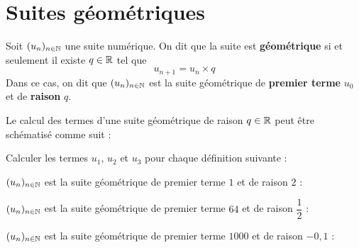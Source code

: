 \documentclass{poly}
\begin{document}
\section{Suites géométriques}
\begin{definition}
Soit $(u_n)_{n \in \mathbb{N}}$ une suite numérique. On dit que la suite est \textbf{géométrique} si et seulement il existe $q \in \mathbb{R}$ tel que
\begin{equation*}
u_{n+1} = u_n \times q
\end{equation*}
Dans ce cas, on dit que $(u_n)_{n \in \mathbb{N}}$ est la suite géométrique de \textbf{premier terme} $u_0$ et de \textbf{raison} $q$.
\end{definition}
\begin{remark}
Le calcul des termes d'une suite géométrique de raison $q \in \mathbb{R}$ peut être schématisé comme suit :
\begin{center}
\end{center}
\end{remark}
\begin{example}
Calculer les termes $u_1$, $u_2$ et $u_3$ pour chaque définition suivante :
\begin{alphaquestions}
\item $(u_n)_{n \in \mathbb{N}}$ est la suite géométrique de premier terme $1$ et de raison $2$ : 
\item $(u_n)_{n \in \mathbb{N}}$ est la suite géométrique de premier terme $64$ et de raison $\dfrac{1}{2}$ : 
\item $(u_n)_{n \in \mathbb{N}}$ est la suite géométrique de premier terme $1000$ et de raison $-0,1$ : 
\end{alphaquestions}
\end{example}
\end{document}
